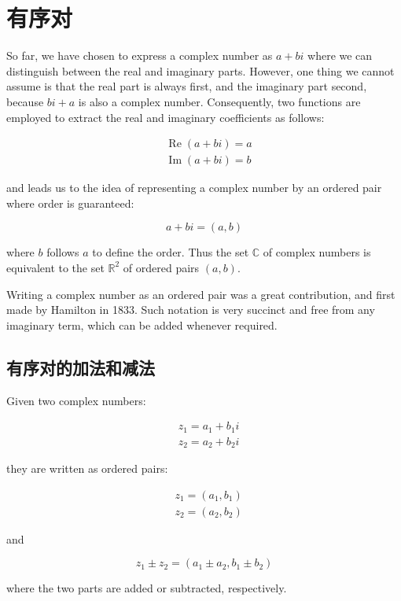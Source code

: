 \section{有序对}
So far, we have chosen to express a complex number as $a+b i$ where we can distinguish between the real and imaginary parts. However, one thing we cannot assume is that the real part is always first, and the imaginary part second, because $b i+a$ is also a complex number. Consequently, two functions are employed to extract the real and imaginary coefficients as follows:

$$
\begin{aligned}
& \operatorname{Re}(a+b i)=a \\
& \operatorname{Im}(a+b i)=b
\end{aligned}
$$

and leads us to the idea of representing a complex number by an ordered pair where order is guaranteed:

$$
a+b i=(a, b)
$$

where $b$ follows $a$ to define the order. Thus the set $\mathbb{C}$ of complex numbers is equivalent to the set $\mathbb{R}^{2}$ of ordered pairs $(a, b)$.

Writing a complex number as an ordered pair was a great contribution, and first made by Hamilton in 1833. Such notation is very succinct and free from any imaginary term, which can be added whenever required.

\subsection{有序对的加法和减法}
Given two complex numbers:

$$
\begin{aligned}
& z_{1}=a_{1}+b_{1} i \\
& z_{2}=a_{2}+b_{2} i
\end{aligned}
$$

they are written as ordered pairs:

$$
\begin{aligned}
& z_{1}=\left(a_{1}, b_{1}\right) \\
& z_{2}=\left(a_{2}, b_{2}\right)
\end{aligned}
$$

and

$$
z_{1} \pm z_{2}=\left(a_{1} \pm a_{2}, b_{1} \pm b_{2}\right)
$$

where the two parts are added or subtracted, respectively.

